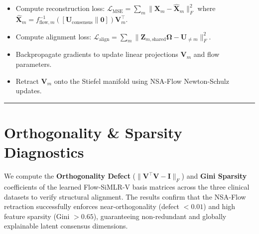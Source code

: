 \documentclass[
  letterpaper,
]{report}
\providecommand{\tightlist}{%
  \setlength{\itemsep}{0pt}\setlength{\parskip}{0pt}}
\begin{document}
\begin{enumerate}
  \begin{itemize}
  \tightlist
  \item
    Compute reconstruction loss:
    \(\mathcal{L}_{\text{MSE}} = \sum_m \|\mathbf{X}_m - \hat{\mathbf{X}}_m\|_F^2\)
    where
    \(\hat{\mathbf{X}}_m = f_{\text{flow}, m}^{-1}([\mathbf{U}_{\text{consensus}} \parallel \mathbf{0}])\mathbf{V}_m^\top\).
  \item
    Compute alignment loss:
    \(\mathcal{L}_{\text{align}} = \sum_m \|\mathbf{Z}_{m, \text{shared}}\mathbf{\Omega} - \mathbf{U}_{\neq m}\|_F^2\).
  \item
    Backpropagate gradients to update linear projections
    \(\mathbf{V}_m\) and flow parameters.
  \item
    Retract \(\mathbf{V}_m\) onto the Stiefel manifold using NSA-Flow
    Newton-Schulz updates.
  \end{itemize}
\end{enumerate}

\begin{center}\rule{0.5\linewidth}{0.5pt}\end{center}

\section{Orthogonality \& Sparsity
Diagnostics}\label{orthogonality-sparsity-diagnostics}

We compute the \textbf{Orthogonality Defect}
(\(\|\mathbf{V}^\top\mathbf{V} - \mathbf{I}\|_F\)) and \textbf{Gini
Sparsity} coefficients of the learned Flow-SiMLR-V basis matrices across
the three clinical datasets to verify structural alignment. The results
confirm that the NSA-Flow retraction successfully enforces
near-orthogonality (defect \(< 0.01\)) and high feature sparsity (Gini
\(> 0.65\)), guaranteeing non-redundant and globally explainable latent
consensus dimensions.
\end{document}
